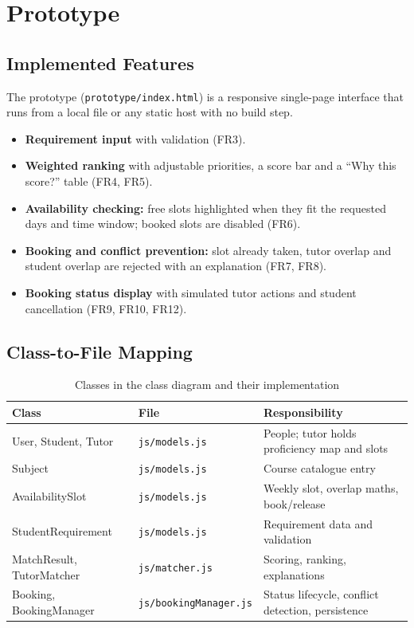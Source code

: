 \documentclass[11pt,a4paper]{article}
\begin{document}
\section{Prototype}
\subsection{Implemented Features}
The prototype (\texttt{prototype/index.html}) is a responsive single-page interface that runs from a local file or any static host with no build step.
\begin{itemize}
  \item \textbf{Requirement input} with validation (FR3).
  \item \textbf{Weighted ranking} with adjustable priorities, a score bar and a ``Why this score?'' table (FR4, FR5).
  \item \textbf{Availability checking:} free slots highlighted when they fit the requested days and time window; booked slots are disabled (FR6).
  \item \textbf{Booking and conflict prevention:} slot already taken, tutor overlap and student overlap are rejected with an explanation (FR7, FR8).
  \item \textbf{Booking status display} with simulated tutor actions and student cancellation (FR9, FR10, FR12).
\end{itemize}

\subsection{Class-to-File Mapping}
\begin{table}[H]
\centering
\caption{Classes in the class diagram and their implementation}
\small
\begin{tabularx}{\linewidth}{@{}l l X@{}}
\toprule
\textbf{Class} & \textbf{File} & \textbf{Responsibility}\\ \midrule
User, Student, Tutor & \texttt{js/models.js} & People; tutor holds proficiency map and slots\\
Subject & \texttt{js/models.js} & Course catalogue entry\\
AvailabilitySlot & \texttt{js/models.js} & Weekly slot, overlap maths, book/release\\
StudentRequirement & \texttt{js/models.js} & Requirement data and validation\\
MatchResult, TutorMatcher & \texttt{js/matcher.js} & Scoring, ranking, explanations\\
Booking, BookingManager & \texttt{js/bookingManager.js} & Status lifecycle, conflict detection, persistence\\
\bottomrule
\end{tabularx}
\end{table}
\end{document}
